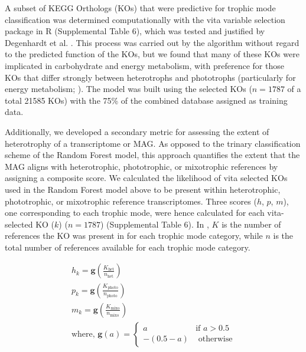 \documentclass[12pt]{article}
\numberwithin{equation}{section}
\begin{document}
A subset of KEGG Orthologs (KOs) that were predictive for trophic mode classification was determined computationally with the vita variable selection package in R \citep{Janitza_2016} (Supplemental Table 6), which was tested and justified by Degenhardt et al. \citet{Degenhardt_2017}. This process was carried out by the algorithm without regard to the predicted function of the KOs, but we found that many of these KOs were implicated in carbohydrate and energy metabolism, with preference for those KOs that differ strongly between heterotrophs and phototrophs (particularly for energy metabolism; ). The model was built using the selected KOs ($n=1787$ of a total 21585 KOs) with the 75\% of the combined database assigned as training data.

Additionally, we developed a secondary metric for assessing the extent of heterotrophy of a transcriptome or MAG. As opposed to the trinary classification scheme of the Random Forest model, this approach quantifies the extent that the MAG aligns with heterotrophic, phototrophic, or mixotrophic references by assigning a composite score. We calculated the likelihood of vita selected KOs used in the Random Forest model above to be present within heterotrophic, phototrophic, or mixotrophic reference transcriptomes. Three scores ($h$, $p$, $m$), one corresponding to each trophic mode, were hence calculated for each vita-selected  KO ($k$) ($n=1787$) (Supplemental Table 6). In  , $K$ is the number of references the KO was present in for each trophic mode category, while $n$ is the total number of references available for each trophic mode category.

\begin{gather}\label{eq:hks}
    h_k = \mathbf{g}\left(\frac{K_\textrm{het}}{n_\textrm{het}}\right)\\
    p_k = \mathbf{g}\left(\frac{K_\textrm{photo}}{n_\textrm{photo}}\right)\\
    m_k = \mathbf{g}\left(\frac{K_\textrm{mixo}}{n_\textrm{mixo}}\right)\\
    \text{where, } \mathbf{g}(a) = \begin{cases}
       a & \textrm{if } a > 0.5 \\
       -(0.5-a) & \textrm{ otherwise} \label{eq:connectfinal}
    \end{cases} 
\end{gather}
\end{document}

